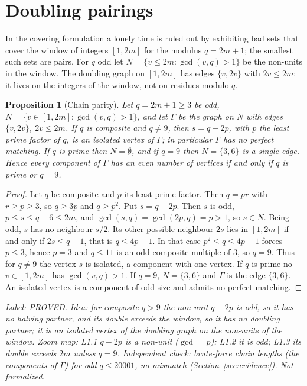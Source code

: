 \documentclass[11pt]{article}
\newtheorem{proposition}[theorem]{Proposition}
\theoremstyle{remark}
\newcommand{\lab}[1]{\par\smallskip\noindent\textit{Label: #1.}}
\begin{document}
\section{Doubling pairings}\label{sec:doubling}

In the covering formulation a lonely time is ruled out by exhibiting bad sets that cover the window of integers $[1,2m]$ for the modulus $q=2m+1$; the smallest such sets are pairs. For $q$ odd let $N=\{v\le 2m:\gcd(v,q)>1\}$ be the non-units in the window. The doubling graph on $[1,2m]$ has edges $\{v,2v\}$ with $2v\le 2m$; it lives on the integers of the window, not on residues modulo $q$.

\begin{proposition}[Chain parity]\label{prop:chain}
Let $q=2m+1\ge3$ be odd, $N=\{v\in[1,2m]:\gcd(v,q)>1\}$, and let $\Gamma$ be the graph on $N$ with edges $\{v,2v\}$, $2v\le2m$. If $q$ is composite and $q\ne9$, then $s=q-2p$, with $p$ the least prime factor of $q$, is an isolated vertex of $\Gamma$; in particular $\Gamma$ has no perfect matching. If $q$ is prime then $N=\emptyset$, and if $q=9$ then $N=\{3,6\}$ is a single edge. Hence every component of $\Gamma$ has an even number of vertices if and only if $q$ is prime or $q=9$.
\end{proposition}
\begin{proof}
Let $q$ be composite and $p$ its least prime factor. Then $q=pr$ with $r\ge p\ge3$, so $q\ge3p$ and $q\ge p^2$. Put $s=q-2p$. Then $s$ is odd, $p\le s\le q-6\le2m$, and $\gcd(s,q)=\gcd(2p,q)=p>1$, so $s\in N$. Being odd, $s$ has no neighbour $s/2$. Its other possible neighbour $2s$ lies in $[1,2m]$ if and only if $2s\le q-1$, that is $q\le4p-1$. In that case $p^2\le q\le4p-1$ forces $p\le3$, hence $p=3$ and $q\le11$ is an odd composite multiple of $3$, so $q=9$. Thus for $q\ne9$ the vertex $s$ is isolated, a component with one vertex. If $q$ is prime no $v\in[1,2m]$ has $\gcd(v,q)>1$. If $q=9$, $N=\{3,6\}$ and $\Gamma$ is the edge $\{3,6\}$. An isolated vertex is a component of odd size and admits no perfect matching.
\end{proof}
\lab{PROVED. Idea: for composite $q>9$ the non-unit $q-2p$ is odd, so it has no halving partner, and its double exceeds the window, so it has no doubling partner; it is an isolated vertex of the doubling graph on the non-units of the window. Zoom map: L1.1 $q-2p$ is a non-unit ($\gcd=p$); L1.2 it is odd; L1.3 its double exceeds $2m$ unless $q=9$. Independent check: brute-force chain lengths (the components of $\Gamma$) for odd $q\le 20001$, no mismatch (Section~\ref{sec:evidence}). Not formalized}
\end{document}
